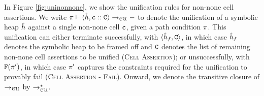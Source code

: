 In Figure \ref{fig:uninonnone}, we show the unification rules for non-none cell assertions. 
We write $\pi \vdash \langle \hat{h}, \mathtt{c} :: \mathtt{C} \rangle \rightarrow_{\cal CU} -$ to denote the unification of a symbolic heap $\hat{h}$ against a single non-none cell $\mathtt{c}$, given a path condition $\pi$. This unification can either terminate
successfully, with $\langle \hat{h}_f, \mathtt{C} \rangle$, in which case $\hat{h}_f$ denotes the
symbolic heap to be framed off and $\mathtt{C}$ denotes the list of remaining non-none cell assertions to be unified (\textsc{Cell Assertion}); or unsuccessfully, with ${\mathtt{F}}(\pi')$, 
in which case $\pi'$ captures the constraints required for the unification to provably fail (\textsc{Cell Assertion - Fail}).
%   
Onward, we denote the transitive closure of $\rightarrow_{\cal CU}$ by $\rightarrow_{\cal CU}^*$. 

